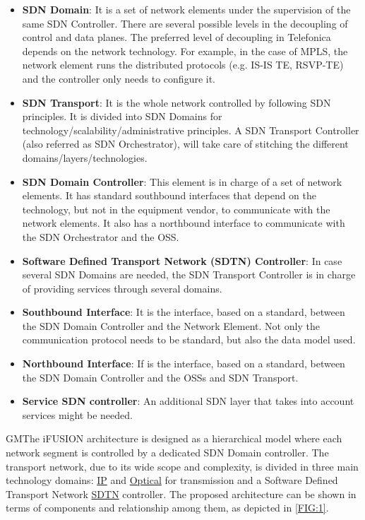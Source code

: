 \documentclass[a4paper,fleqn]{cas-dc}
\begin{document}
\begin{itemize}
\item \textbf{SDN Domain}: It is a set of network elements under the supervision of the same SDN Controller. There are several possible levels in the decoupling of control and data planes. The preferred level of decoupling in Telefonica depends on the network technology. For example, in the case of MPLS, the network element runs the distributed protocols (e.g. IS-IS TE, RSVP-TE) and the controller only needs to configure it.

\item \textbf{SDN Transport}: It is the whole network controlled by following SDN principles. It is divided into SDN Domains for technology/scalability/administrative principles. A SDN Transport Controller (also referred as SDN Orchestrator), will take care of stitching the different domains/layers/technologies.

\item \textbf{SDN Domain Controller}: This element is in charge of a set of network elements. It has standard southbound interfaces that depend on the technology, but not in the equipment vendor, to communicate with the network elements. It also has a northbound interface to communicate with the SDN Orchestrator and the OSS.

\item \textbf{Software Defined Transport Network (SDTN) Controller}: In case several SDN Domains are needed, the SDN Transport Controller is in charge of providing services through several domains. 

\item \textbf{Southbound Interface}: It is the interface, based on a standard, between the SDN Domain Controller and the Network Element. Not only the communication protocol needs to be standard, but also the data model used.

\item \textbf{Northbound Interface}: If is the interface, based on a standard, between the SDN Domain Controller and the OSSs and SDN Transport.

\item \textbf{Service SDN controller}: An additional SDN layer that takes into account services might be needed. 
\end{itemize}

GMThe i\uppercase{FUSION} architecture is designed as a hierarchical model where each network segment is controlled by a dedicated SDN Domain controller. The transport network, due to its wide scope and complexity, is divided in three main technology domains: \hyperref[section:ip]{IP} and \hyperref[section:dwdm]{Optical} for transmission and a Software Defined Transport Network \hyperref[section:sdtn]{SDTN} controller. The proposed architecture can be shown in terms of components and relationship among them, as depicted in \cref{FIG:1}. 
\end{document}
